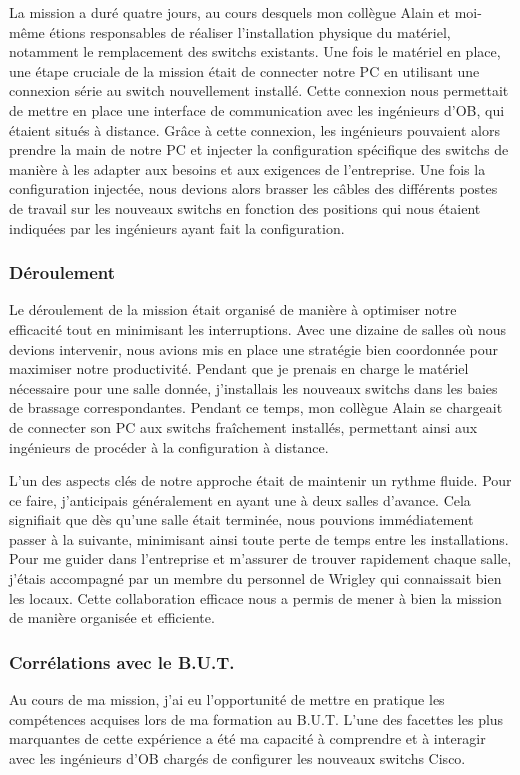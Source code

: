 \documentclass[12pt, a4paper]{article}
\begin{document}
La mission a duré quatre jours, au cours desquels 
mon collègue Alain et moi-même étions responsables 
de réaliser l'installation physique
du matériel, notamment le remplacement des switchs existants.
Une fois le matériel en place, une étape cruciale de la mission
était de connecter notre PC en utilisant une connexion série au
switch nouvellement installé. Cette connexion nous
permettait de mettre en place une interface de communication
avec les ingénieurs d'\gls{OB},
qui étaient situés à distance.
Grâce à cette connexion, les ingénieurs pouvaient alors prendre
la main de notre PC et injecter
la configuration spécifique des switchs de manière à les adapter
aux besoins et aux exigences de l'entreprise.
Une fois la configuration injectée, nous devions alors brasser 
les câbles des différents postes de travail sur les nouveaux switchs
en fonction des positions qui nous étaient indiquées par les
ingénieurs ayant fait la configuration.

\subsubsection{Déroulement}
Le déroulement de la mission était organisé de manière à optimiser
notre efficacité tout en minimisant les interruptions. Avec une
dizaine de salles où nous devions intervenir, nous avions mis en place une stratégie
bien coordonnée pour maximiser notre productivité. Pendant que je
prenais en charge le matériel nécessaire pour une salle donnée,
j'installais les nouveaux switchs dans les baies de brassage
correspondantes. Pendant ce temps, mon collègue Alain se chargeait
de connecter son PC aux switchs fraîchement installés, permettant
ainsi aux ingénieurs de procéder à la configuration à distance.

L'un des aspects clés de notre approche était de maintenir un
rythme fluide. Pour ce faire, j'anticipais généralement en ayant
une à deux salles d'avance. Cela signifiait
que dès qu'une salle était terminée, nous pouvions immédiatement
passer à la suivante, minimisant ainsi toute perte de temps entre
les installations. Pour me guider dans l'entreprise et
m'assurer de trouver rapidement chaque salle, j'étais accompagné
par un membre du personnel de Wrigley qui connaissait bien les locaux.
Cette collaboration efficace nous a permis de mener à bien la mission
de manière organisée et efficiente.

\subsubsection{Corrélations avec le B.U.T.}
Au cours de ma mission, j'ai eu l'opportunité de mettre en
pratique les compétences acquises lors de ma formation au B.U.T.
L'une des facettes les plus marquantes de cette expérience a
été ma capacité à comprendre et à interagir avec les ingénieurs
d'\gls{OB} chargés de configurer les nouveaux switchs Cisco.
\end{document}

